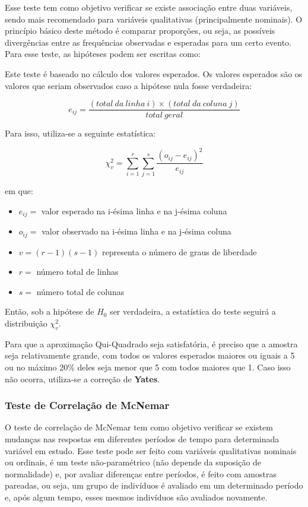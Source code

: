 \documentclass[
]{estat/estat}
\providecommand{\tightlist}{%
  \setlength{\itemsep}{0pt}\setlength{\parskip}{0pt}}\usepackage{longtable,booktabs,array}
\begin{document}
Esse teste tem como objetivo verificar se existe associação entre duas
variáveis, sendo mais recomendado para variáveis qualitativas
(principalmente nominais). O princípio básico deste método é comparar
proporções, ou seja, as possíveis divergências entre as frequências
observadas e esperadas para um certo evento. Para esse teste, as
hipóteses podem ser escritas como:


Este teste é baseado no cálculo dos valores esperados. Os valores
esperados são os valores que seriam observados caso a hipótese nula
fosse verdadeira:

\[e_{ij} = \frac{(total\ da\ linha\ i) \times (total\ da\ coluna\ j)}{total\ geral} \]

Para isso, utiliza-se a seguinte estatística:

\[\chi_{v}^{2} = \displaystyle\sum_{i=1}^r \sum_{j=1}^s \frac{ {(o_{ij} - e_{ij})}^2}{e_{ij}}\]

em que:

\begin{itemize}
\tightlist
\item
  \(e_{ij}=\) valor esperado na i-ésima linha e na j-ésima coluna
\item
  \(o_{ij}=\) valor observado na i-ésima linha e na j-ésima coluna
\item
  \(v = (r - 1)(s - 1)\) representa o número de graus de liberdade
\item
  \(r=\) número total de linhas
\item
  \(s=\) número total de colunas
\end{itemize}

Então, sob a hipótese de \(H_{0}\) ser verdadeira, a estatística do
teste seguirá a distribuição \(\chi_{v}^{2}\).

Para que a aproximação Qui-Quadrado seja satisfatória, é preciso que a
amostra seja relativamente grande, com todos os valores esperados
maiores ou iguais a 5 ou no máximo 20\% deles seja menor que 5 com todos
maiores que 1. Caso isso não ocorra, utiliza-se a correção de
\textbf{Yates}.

\subsubsection{Teste de Correlação de
McNemar}\label{teste-de-correlauxe7uxe3o-de-mcnemar}

O teste de correlação de McNemar tem como objetivo verificar se existem
mudanças nas respostas em diferentes períodos de tempo para determinada
variável em estudo. Esse teste pode ser feito com variáveis qualitativas
nominais ou ordinais, é um teste não-paramétrico (não depende da
suposição de normalidade) e, por avaliar diferenças entre períodos, é
feito com amostras pareadas, ou seja, um grupo de indivíduos é avaliado
em um determinado período e, após algum tempo, esses mesmos indivíduos
são avaliados novamente.
\end{document}
